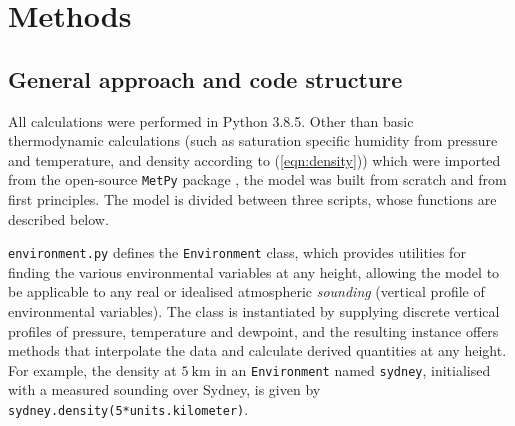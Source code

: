 \documentclass[12pt,titlepage]{article}
\begin{document}


\section{Methods}
\subsection{General approach and code structure}
All calculations were performed in Python 3.8.5. Other than
basic thermodynamic calculations (such as saturation specific humidity
from pressure and temperature, and density according to
(\ref{eqn:density})) which were imported from the open-source
\verb|MetPy| package \parencite{metpy}, the model was built from
scratch and from first principles. The model is divided between
three scripts, whose functions are described below.

\verb|environment.py| defines the \verb|Environment| class, which
provides utilities for finding the various environmental variables
at any height, allowing the model to be applicable to any real or
idealised atmospheric \emph{sounding} (vertical profile of environmental
variables). The class is instantiated by supplying discrete vertical
profiles of pressure, temperature and dewpoint, and the resulting
instance offers methods that interpolate the data and calculate
derived quantities at any height. For example, the density at
$\SI{5}{\kilo\meter}$ in an \verb|Environment| named \verb|sydney|,
initialised with a measured sounding over Sydney, is given by
\verb|sydney.density(5*units.kilometer)|.
\end{document}
